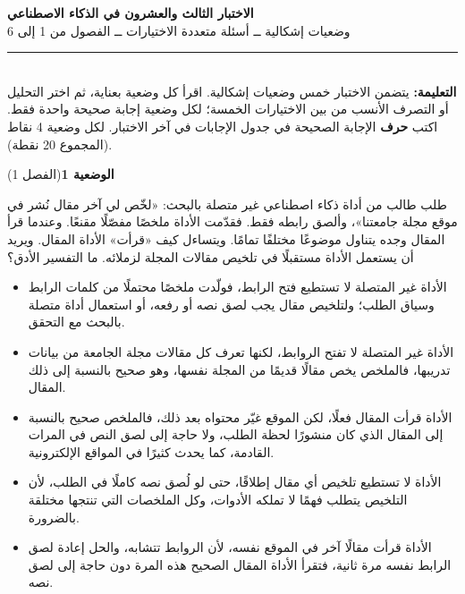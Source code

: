 \documentclass[11pt,a4paper]{article}
\begin{document}
\linespread{1.08}\selectfont
\begin{center}
{\LARGE\khatt\textbf{الاختبار الثالث والعشرون في الذكاء الاصطناعي}}\\[4pt]
{\normalsize وضعيات إشكالية ــ أسئلة متعددة الاختيارات ــ الفصول من 1 إلى 6}
\end{center}
\vspace{-2pt}\rule{\textwidth}{0.6pt}\\[2pt]
\textbf{التعليمة:} يتضمن الاختبار خمس وضعيات إشكالية. اقرأ كل وضعية بعناية، ثم اختر التحليل أو التصرف الأنسب
من بين الاختيارات الخمسة؛ لكل وضعية إجابة صحيحة واحدة فقط.
اكتب \textbf{حرف} الإجابة الصحيحة في جدول الإجابات في آخر الاختبار.
لكل وضعية 4 نقاط (المجموع 20 نقطة).
\vspace{4pt}

\noindent
{\large\khatt\textbf{الوضعية 1}}\hfill{\small(الفصل 1)}\par\nopagebreak\vspace{3pt}
\setlength{\fboxsep}{7pt}\colorbox{gray!10}{\parbox{\dimexpr\linewidth-14pt}{طلب طالب من أداة ذكاء اصطناعي غير متصلة بالبحث: «لخّص لي آخر مقال نُشر في موقع مجلة جامعتنا»، وألصق رابطه فقط. فقدّمت الأداة ملخصًا مفصّلًا مقنعًا. وعندما قرأ المقال وجده يتناول موضوعًا مختلفًا تمامًا. ويتساءل كيف «قرأت» الأداة المقال. ويريد أن يستعمل الأداة مستقبلًا في تلخيص مقالات المجلة لزملائه. ما التفسير الأدق؟}}\par\nopagebreak
\begin{itemize}[leftmargin=1.0cm, labelsep=6pt, itemsep=3pt, topsep=4pt, parsep=0pt]
  \item[\textbf{أ)}] الأداة غير المتصلة لا تستطيع فتح الرابط، فولّدت ملخصًا محتملًا من كلمات الرابط وسياق الطلب؛ ولتلخيص مقال يجب لصق نصه أو رفعه، أو استعمال أداة متصلة بالبحث مع التحقق.
  \item[\textbf{ب)}] الأداة غير المتصلة لا تفتح الروابط، لكنها تعرف كل مقالات مجلة الجامعة من بيانات تدريبها، فالملخص يخص مقالًا قديمًا من المجلة نفسها، وهو صحيح بالنسبة إلى ذلك المقال.
  \item[\textbf{ج)}] الأداة قرأت المقال فعلًا، لكن الموقع غيّر محتواه بعد ذلك، فالملخص صحيح بالنسبة إلى المقال الذي كان منشورًا لحظة الطلب، ولا حاجة إلى لصق النص في المرات القادمة، كما يحدث كثيرًا في المواقع الإلكترونية.
  \item[\textbf{د)}] الأداة لا تستطيع تلخيص أي مقال إطلاقًا، حتى لو لُصق نصه كاملًا في الطلب، لأن التلخيص يتطلب فهمًا لا تملكه الأدوات، وكل الملخصات التي تنتجها مختلقة بالضرورة.
  \item[\textbf{هـ)}] الأداة قرأت مقالًا آخر في الموقع نفسه، لأن الروابط تتشابه، والحل إعادة لصق الرابط نفسه مرة ثانية، فتقرأ الأداة المقال الصحيح هذه المرة دون حاجة إلى لصق نصه.
\end{itemize}
\end{document}
